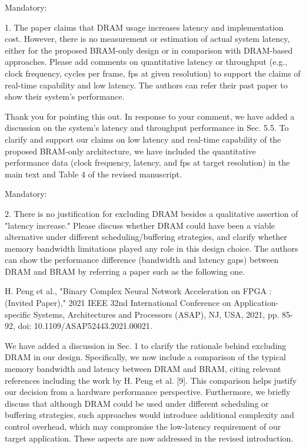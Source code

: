 \documentclass[a4j]{jsarticle}
\begin{document}
\begin{screen}
Mandatory:

1. The paper claims that DRAM usage increases latency and implementation cost. However, there is no measurement or estimation of actual system latency, either for the proposed BRAM-only design or in comparison with DRAM-based approaches. Please add comments on quantitative latency or throughput (e.g., clock frequency, cycles per frame, fps at given resolution) to support the claims of real-time capability and low latency. The authors can refer their past paper to show their system's performance.
\end{screen}

Thank you for pointing this out. In response to your comment, we have added a discussion on the system's latency and throughput performance in Sec. 5.5.
To clarify and support our claims on low latency and real-time capability of the proposed BRAM-only architecture, 
we have included the quantitative performance data (clock frequency, latency, and fps at target resolution) in the main text and Table 4 of the revised manuscript. 

\vspace{0.3cm}
\begin{screen}
Mandatory:

2. There is no justification for excluding DRAM besides a qualitative assertion of "latency increase." Please discuss whether DRAM could have been a viable alternative under different scheduling/buffering strategies, and clarify whether memory bandwidth limitations played any role in this design choice. The authors can show the performance difference (bandwidth and latency gaps) between DRAM and BRAM by referring a paper such as the following one.

H. Peng et al., "Binary Complex Neural Network Acceleration on FPGA : (Invited Paper)," 2021 IEEE 32nd International Conference on Application-specific Systems, Architectures and Processors (ASAP), NJ, USA, 2021, pp. 85-92, doi: 10.1109/ASAP52443.2021.00021.
\end{screen}
We have added a discussion in Sec. 1 to clarify the rationale behind excluding DRAM in our design.
Specifically, we now include a comparison of the typical memory bandwidth and latency between DRAM and BRAM, 
citing relevant references including the work by H. Peng et al. [9]. 
This comparison helps justify our decision from a hardware performance perspective.
Furthermore, we briefly discuss that although DRAM could be used under different scheduling or buffering strategies, 
such approaches would introduce additional complexity and control overhead, which may compromise the low-latency requirement of our target application. 
These aspects are now addressed in the revised introduction.
\end{document}
